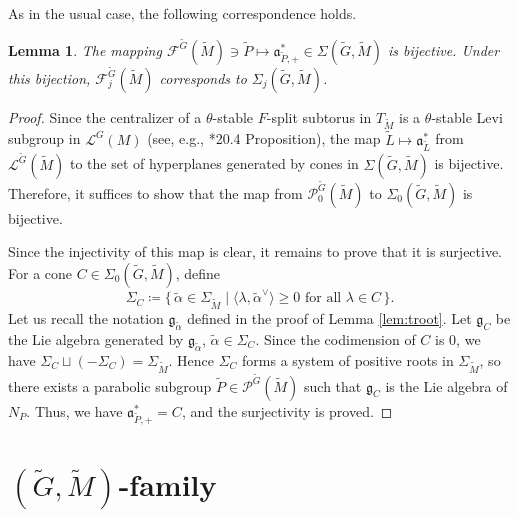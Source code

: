 \documentclass[12pt]{amsart}
\theoremstyle{definition}
\theoremstyle{plain}
\newtheorem{lemma}[definition]{Lemma}
\theoremstyle{remark}
\newcommand{\fa}{\mathfrak{a}}
\newcommand{\fg}{\mathfrak{g}}
\newcommand{\cF}{\mathcal{F}}
\newcommand{\cL}{\mathcal{L}}
\newcommand{\cP}{\mathcal{P}}
\numberwithin{equation}{section}
\newcommand{\tG}{\widetilde{G}}
\newcommand{\tM}{\widetilde{M}}
\newcommand{\tL}{\widetilde{L}}
\newcommand{\tP}{\widetilde{P}}
\newcommand{\talpha}{\widetilde{\alpha}}
\begin{document}
As in the usual case, the following correspondence holds.
\begin{lemma}\label{lem:corrFSigma}
    The mapping $\cF^{\tG}(\tM)\ni \tP\mapsto \fa^*_{\tP,+}\in\Sigma(\tG,\tM)$ is bijective. Under this bijection, $\cF_j^{\tG}(\tM)$ corresponds to $\Sigma_j(\tG,\tM)$. 
\end{lemma}
\begin{proof}
    Since the centralizer of a $\theta$-stable $F$-split subtorus in $T_{\tM}$ is a $\theta$-stable Levi subgroup in $\cL^G(M)$ (see, e.g., \cite{Bor91}*{20.4 Proposition}), the map $\tL \longmapsto \fa_{\tL}^*$ from $\cL^{\tG}(\tM)$ to the set of hyperplanes generated by cones in $\Sigma(\tG,\tM)$ is bijective.    
    Therefore, it suffices to show that the map from $\cP^{\tG}_0(\tM)$ to $\Sigma_0(\tG,\tM)$ is bijective. 
    
    Since the injectivity of this map is clear, it remains to prove that it is surjective. 
    For a cone $C\in \Sigma_0(\tG,\tM)$, define
\[
\Sigma_C\coloneqq\{\, \talpha\in\Sigma_{\tM}\mid 
\langle\lambda,\talpha^\vee\rangle\ge 0 \text{ for all } \lambda\in C \,\}.
\]
Let us recall the notation $\fg_{\talpha}$ defined in the proof of Lemma \ref{lem:troot}.
Let $\fg_C$ be the Lie algebra generated by $\fg_{\talpha}$, $\talpha\in\Sigma_C$.
Since the codimension of $C$ is $0$, we have $\Sigma_C\sqcup(-\Sigma_C)=\Sigma_{\tM}$.
Hence $\Sigma_C$ forms a system of positive roots in $\Sigma_{\tM}$, so there exists a parabolic subgroup $\tP \in \cP^{\tG}(\tM)$ such that $\fg_C$ is the Lie algebra of $N_P$.
Thus, we have $\fa^*_{\tP,+}=C$, and the surjectivity is proved.
\end{proof}



\section{\texorpdfstring{$(\tG,\tM)$}{GM}-family}\label{sec:tGtM}
\end{document}

